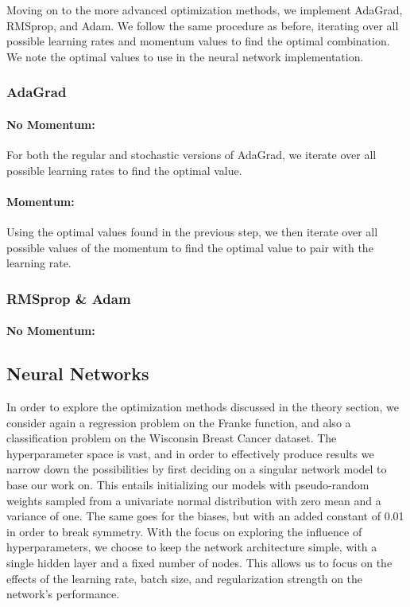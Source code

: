 \documentclass[aps,pra,english,notitlepage,reprint,nofootinbib]{revtex4-1}  %
\begin{document}
Moving on to the more advanced optimization methods, we implement AdaGrad, RMSprop, and Adam. We follow the same procedure as before, iterating over all possible learning rates and momentum values to find the optimal combination. We note the optimal values to use in the neural network implementation.

\subsubsection{AdaGrad}
\paragraph{No Momentum:}
For both the regular and stochastic versions of AdaGrad, we iterate over all possible learning rates to find the optimal value.

\paragraph{Momentum:}
Using the optimal values found in the previous step, we then iterate over all possible values of the momentum to find the optimal value to pair with the learning rate.

\subsubsection{RMSprop \& Adam}
\paragraph{No Momentum:}

\subsection{Neural Networks}
In order to explore the optimization methods discussed in the theory section, we consider again a regression problem on the Franke function, and also a classification problem on the Wisconsin Breast Cancer dataset. %
The hyperparameter space is vast, and in order to effectively produce results we narrow down the possibilities by first deciding on a singular network model to base our work on. This entails initializing our models with pseudo-random weights sampled from a univariate normal distribution with zero mean and a variance of one. The same goes for the biases, but with an added constant of 0.01 in order to break symmetry. With the focus on exploring the influence of hyperparameters, we choose to keep the network architecture simple, with a single hidden layer and a fixed number of nodes. This allows us to focus on the effects of the learning rate, batch size, and regularization strength on the network's performance.
\end{document}
